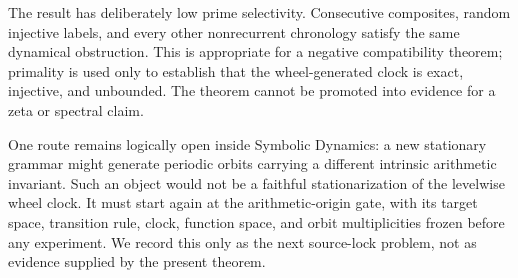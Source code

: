 The result has deliberately low prime selectivity.  Consecutive composites,
random injective labels, and every other nonrecurrent chronology satisfy the
same dynamical obstruction.  This is appropriate for a negative
compatibility theorem; primality is used only to establish that the
wheel-generated clock is exact, injective, and unbounded.  The theorem
cannot be promoted into evidence for a zeta or spectral claim.

One route remains logically open inside Symbolic Dynamics: a new stationary
grammar might generate periodic orbits carrying a different intrinsic
arithmetic invariant.  Such an object would not be a faithful
stationarization of the levelwise wheel clock.  It must start again at the
arithmetic-origin gate, with its target space, transition rule, clock,
function space, and orbit multiplicities frozen before any experiment.  We
record this only as the next source-lock problem, not as evidence supplied by
the present theorem.
